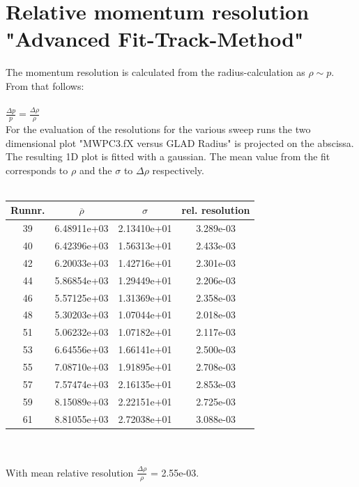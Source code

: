 \documentclass[12pt, letterpaper]{article}
\begin{document}
\section{Relative momentum resolution "Advanced Fit-Track-Method"}

The momentum resolution is calculated from the radius-calculation as $\rho \sim p$. From that follows:\\
\\
$\frac{\Delta p}{p} = \frac{\Delta\rho}{\rho}$
\\
\newline
For the evaluation of the resolutions for the various sweep runs the two dimensional plot "MWPC3.fX versus GLAD Radius" is projected on the abscissa. The resulting 1D plot is fitted with a gaussian. The mean value from the fit corresponds to $\rho$ and the $\sigma$ to $\Delta\rho$ respectively.\\
\\
\begin{tabular}{|c|c|c|c|}
\hline
Runnr. & $\overline{\rho}$ & $\sigma$ & rel. resolution \\
\hline
39     &      6.48911e+03       &    2.13410e+01    &     3.289e-03\\
40     &      6.42396e+03       &    1.56313e+01    &     2.433e-03\\
42     &      6.20033e+03       &    1.42716e+01    &     2.301e-03\\
44     &      5.86854e+03       &    1.29449e+01    &     2.206e-03\\
46     &      5.57125e+03       &    1.31369e+01    &     2.358e-03\\
48     &      5.30203e+03       &    1.07044e+01    &     2.018e-03\\
51     &      5.06232e+03       &    1.07182e+01    &     2.117e-03\\
53     &      6.64556e+03       &    1.66141e+01    &     2.500e-03\\
55     &      7.08710e+03       &    1.91895e+01    &     2.708e-03\\
57     &      7.57474e+03       &    2.16135e+01    &     2.853e-03\\
59     &      8.15089e+03       &    2.22151e+01    &     2.725e-03\\
61     &      8.81055e+03       &    2.72038e+01    &     3.088e-03\\

\hline

\end{tabular}
\\
\\
\newline
With mean relative resolution $\frac{\Delta\rho}{\rho}$ = 2.55e-03.
\end{document}

